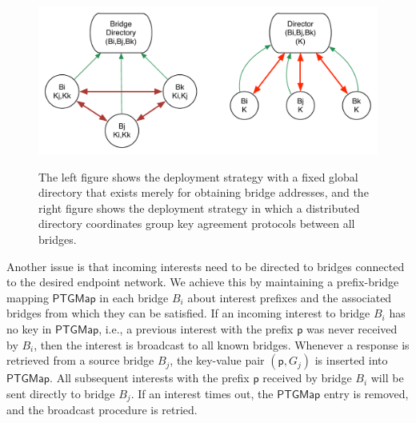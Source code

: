\begin{figure}[ht!]
\begin{center}
\includegraphics[scale=0.45]{./images/gateway_group.pdf}
\label{fig:gateway-groups}
\caption{The left figure shows the deployment strategy with a fixed global directory that exists merely for obtaining bridge addresses, and the right figure shows the deployment strategy in which a distributed directory coordinates group key agreement protocols between all bridges.}
\end{center}
\end{figure}

Another issue is that incoming interests need to be directed to bridges connected to the desired endpoint network. We achieve this by maintaining a prefix-bridge mapping $\mathsf{PTGMap}$ in each bridge $B_i$ about interest prefixes and the associated bridges from which they can be satisfied. If an incoming interest to bridge $B_i$ has no key in $\mathsf{PTGMap}$, i.e., a previous interest with the prefix $\mathsf{p}$ was never received by $B_i$, then the interest is broadcast to all known bridges. Whenever a response is retrieved from a source bridge $B_j$, the key-value pair $(\mathsf{p}, G_j)$ is inserted into $\mathsf{PTGMap}$. All subsequent interests with the prefix $\mathsf{p}$ received by bridge $B_i$ will be sent directly to bridge $B_j$. If an interest times out, the $\mathsf{PTGMap}$ entry is removed, and the broadcast procedure is retried. 

    



